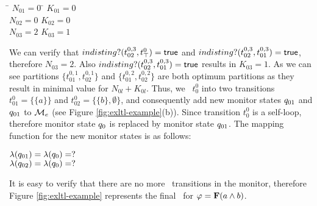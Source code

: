 \begin{tabbing}
\hspace{2cm} \= $N_{01} = 0$ \hspace{1cm} \= $K_{01} = 0$ \\
\> $N_{02} = 0$ \> $K_{02} = 0$ \\
\> $N_{03} = 2$ \> $K_{03} = 1$
\end{tabbing}

We can verify that $indisting?(t_{02}^{0,3}, t_\top^0) = \mathsf{true}$ and  
$indisting?(t_{02}^{0,3}, t_{01}^{0,3}) =\mathsf{true}$, therefore $N_{03} = 2$. Also 
$indisting?(t_{02}^{0,3}, t_{01}^{0,3}) =\mathsf{true}$ results in $K_{03} = 1$. As we 
can see partitions $\{t_{01}^{0,1}, t_{02}^{0,1}\}$ and $\{t_{01}^{0,2}, 
t_{02}^{0,2}\}$ are both optimum partitions as they result in minimal value for 
$N_{0l} + K_{0l}$. Thus, we \splt~$t_0^0$ into two transitions $t_{01}^0 = 
\{\{a\}\}$ and $t_{02}^0 = \{\{b\}, \emptyset\}$, and consequently add new 
monitor states $q_{01}$ and $q_{01}$ to $\mathcal{M}_e$ (see 
Figure \ref{fig:exltl-example}(b)). Since transition $t_0^0$ is a self-loop, 
therefore monitor state $q_0$ is replaced by monitor state 
$q_{01}$. The mapping function for the new monitor states is as follows:

\begin{center}
$\lambda(q_{01}) = \lambda(q_0) = ?$\\
$\lambda(q_{02}) = \lambda(q_0) = ?$
\end{center}

\noindent It is easy to verify that there are no more \indist~transitions in 
the monitor, therefore Figure \ref{fig:exltl-example} represents the final 
\Exltl~for $\varphi = \mathbf{F} (a \wedge b)$. 


\iffalse
\subparagraph{Example} We repeat the example from Section \ref{sec:SAMltl3} and 
this time we use \Exltl~in our algorithm.

$$\varphi = \F(a \wedge b)$$


Let $\monitor=\{M_1, M_2, M_3, M_4\}$, $s=\{a,b\}$, $S^s_1(a)=true$, 
$S^s_1(b)=\natural$, $S^s_2(a)=\natural$, $S^s_2(b)=true$, $S^s_3(a) =\natural$, 
$S^s_3(b) =\natural$,  $S^s_4(a) =\natural$, $S^s_4(b) =\natural$, and let 
$f=2$. According to Algorithm \ref{alg:localmonalgo3}, each local monitor $M_i$ 
computes an abstract local state $\abstate_i^1$ based on its concrete local 
state using abstraction functions $\mu_1$ and $\mu_2$ (cf. Line 
\fi


